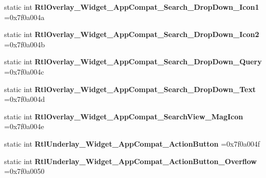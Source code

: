 \begin{DoxyCompactItemize}
static int {\bfseries Rtl\+Overlay\+\_\+\+Widget\+\_\+\+App\+Compat\+\_\+\+Search\+\_\+\+Drop\+Down\+\_\+\+Icon1} =0x7f0a004a
\item 
\mbox{\label{classandroid_1_1support_1_1graphics_1_1drawable_1_1animated_1_1R_1_1style_afeb14dd95d6b12f5bbaa3e62dedf7800}} 
static int {\bfseries Rtl\+Overlay\+\_\+\+Widget\+\_\+\+App\+Compat\+\_\+\+Search\+\_\+\+Drop\+Down\+\_\+\+Icon2} =0x7f0a004b
\item 
\mbox{\label{classandroid_1_1support_1_1graphics_1_1drawable_1_1animated_1_1R_1_1style_ac8d3cdccf57135ee1a33108219f8a02c}} 
static int {\bfseries Rtl\+Overlay\+\_\+\+Widget\+\_\+\+App\+Compat\+\_\+\+Search\+\_\+\+Drop\+Down\+\_\+\+Query} =0x7f0a004c
\item 
\mbox{\label{classandroid_1_1support_1_1graphics_1_1drawable_1_1animated_1_1R_1_1style_a81ce9582769ce7d3cac23767df8a414e}} 
static int {\bfseries Rtl\+Overlay\+\_\+\+Widget\+\_\+\+App\+Compat\+\_\+\+Search\+\_\+\+Drop\+Down\+\_\+\+Text} =0x7f0a004d
\item 
\mbox{\label{classandroid_1_1support_1_1graphics_1_1drawable_1_1animated_1_1R_1_1style_a39107895858bbe3c2cbf92cfba73a8a8}} 
static int {\bfseries Rtl\+Overlay\+\_\+\+Widget\+\_\+\+App\+Compat\+\_\+\+Search\+View\+\_\+\+Mag\+Icon} =0x7f0a004e
\item 
\mbox{\label{classandroid_1_1support_1_1graphics_1_1drawable_1_1animated_1_1R_1_1style_a72d9ef8f1884b918592560aa4c2acec9}} 
static int {\bfseries Rtl\+Underlay\+\_\+\+Widget\+\_\+\+App\+Compat\+\_\+\+Action\+Button} =0x7f0a004f
\item 
\mbox{\label{classandroid_1_1support_1_1graphics_1_1drawable_1_1animated_1_1R_1_1style_a478f60461a28067a3e109dadfc574d95}} 
static int {\bfseries Rtl\+Underlay\+\_\+\+Widget\+\_\+\+App\+Compat\+\_\+\+Action\+Button\+\_\+\+Overflow} =0x7f0a0050
\item 

\end{DoxyCompactItemize}
